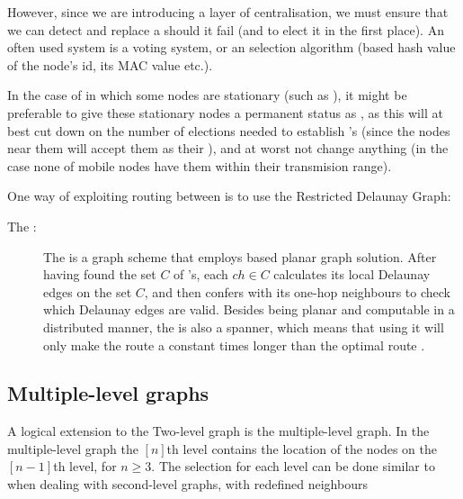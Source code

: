 However, since we are introducing a layer of centralisation, we must ensure that we can detect and replace a \ch should it fail (and to elect it in the first place). An often used system is a voting system, or an selection algorithm (based hash value of the node's id, its MAC value etc.).

In the case of \manet in which some nodes are stationary (such as \cite{two-tier}), it might be preferable to give these stationary nodes a permanent status as \ch, as this will at best cut down on the number of elections needed to establish \ch's (since the nodes near them will accept them as their \ch), and at worst not change anything (in the case none of mobile nodes have them within their transmision range).

One way of exploiting routing between \ch is to use the Restricted Delaunay Graph:
\begin{description}
\item[The \rdg:] The \rdg is a graph scheme that employs \ch based planar graph solution. After having found the set $C$ of \ch's, each $ch \in C$ calculates its local Delaunay edges on the set $C$, and then confers with its one-hop \ch neighbours to check which Delaunay edges are valid. Besides being planar and computable in a distributed manner, the \rdg is also a spanner, which means that using it will only make the route a constant times longer than the optimal route \cite{GeoSpanners}.
\end{description}

\subsection{Multiple-level graphs}
A logical extension to the Two-level graph is the multiple-level graph. In the multiple-level graph the $[n]$th level contains the location of the nodes on the $[n-1]$th level, for $n \geq 3$. The selection for each level can be done similar to when dealing with second-level graphs, with redefined neighbours    
